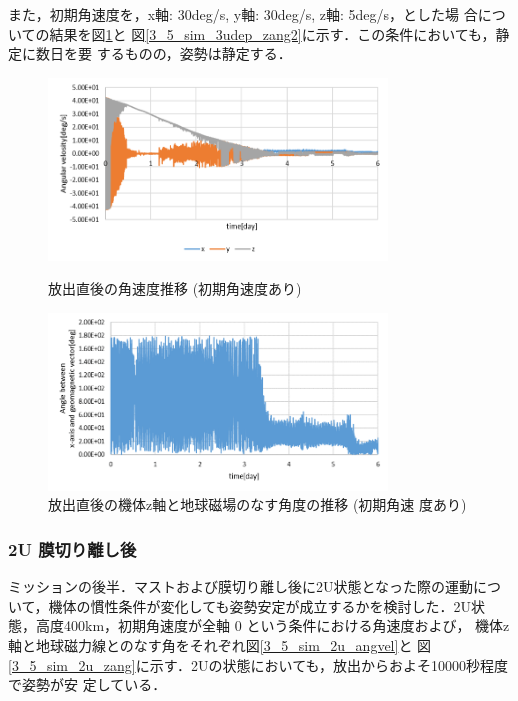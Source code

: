 また，初期角速度を，x軸: 30deg/s, y軸: 30deg/s, z軸: 5deg/s，とした場
合についての結果を図\ref{3_5_sim_3udep_angvel2}と
図\ref{3_5_sim_3udep_zang2}に示す．この条件においても，静定に数日を要
するものの，姿勢は静定する．

\begin{figure}[htbp]
	\centering
	\includegraphics[width=9cm]{./03/fig/3_5_sim_3udep_angvel2.png}
	\caption{放出直後の角速度推移 (初期角速度あり)}
	\label{3_5_sim_3udep_angvel2}
	\centering
	\includegraphics[width=9cm]{./03/fig/3_5_sim_3udep_zang2.png}
	\caption{放出直後の機体z軸と地球磁場のなす角度の推移 (初期角速
          度あり)}
	\label{3_5_sim_3udep_angvel2}
\end{figure}

\subsubsection{2U 膜切り離し後}
ミッションの後半．マストおよび膜切り離し後に2U状態となった際の運動につ
いて，機体の慣性条件が変化しても姿勢安定が成立するかを検討した．2U状態，高度400km，初期角速度が全軸 0 という条件における角速度および，
機体z軸と地球磁力線とのなす角をそれぞれ図\ref{3_5_sim_2u_angvel}と
図\ref{3_5_sim_2u_zang}に示す．2Uの状態においても，放出からおよそ10000秒程度で姿勢が安
定している．


